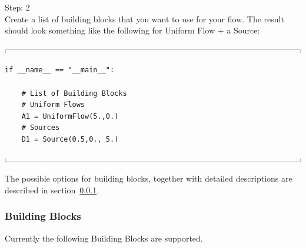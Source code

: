 \documentclass[10pt,a4paper]{article}
\newcommand{\topbar}{\ensuremath{
    \rule{0.1mm}{2.0mm} \rule[2.0mm]{159.5mm}{0.1mm} \rule{0.1mm}{2.0mm}
}}
\newcommand{\bottombar}{\ensuremath{
    \rule{0.1mm}{2.0mm} \rule{159.5mm}{0.1mm} \rule{0.1mm}{2.0mm}
}}
\begin{document}
\noindent
{\LARGE Step: 2}\\
Create a list of building blocks that you want to use for your flow. 
The result should look something like the following for Uniform Flow $+$ a Source:
 
\noindent
\topbar
\begin{lstlisting}
if __name__ == "__main__":

    # List of Building Blocks 
    # Uniform Flows  
    A1 = UniformFlow(5.,0.)
    # Sources
    D1 = Source(0.5,0., 5.)
\end{lstlisting}
\bottombar

The possible options for building blocks, together with detailed descriptions are described in section~\ref{S_building_blocks}.


\subsubsection{Building Blocks}\label{S_building_blocks}
Currently the following Building Blocks are supported.
\end{document}
